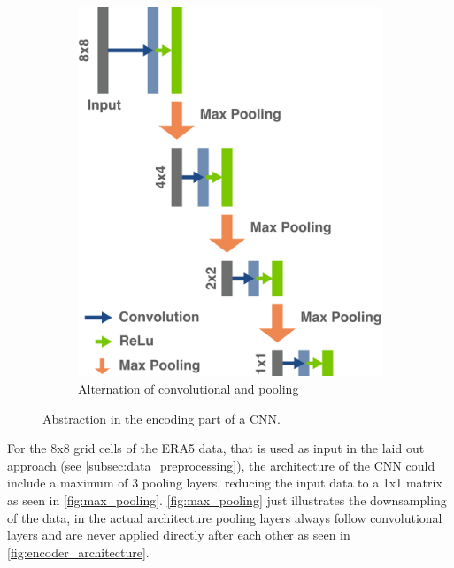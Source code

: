 \begin{figure}
\begin{subfigure}{0.30\textwidth}
        \includegraphics[width=\textwidth]{resources/images/encoder_architecture.png}
        \caption{Alternation of convolutional and pooling}
        \label{fig:encoder_architecture}
    \end{subfigure}
    \caption{Abstraction in the encoding part of a CNN.}
\end{figure}


For the 8x8 grid cells of the ERA5 data, that is used as input in the laid out approach (see \autoref{subsec:data_preprocessing}), the architecture of the CNN could include a maximum of 3 pooling layers, reducing the input data to a 1x1 matrix as seen in \autoref{fig:max_pooling}. \autoref{fig:max_pooling} just illustrates the downsampling of the data, in the actual architecture pooling layers always follow convolutional layers and are never applied directly after each other as seen in \autoref{fig:encoder_architecture}. 


